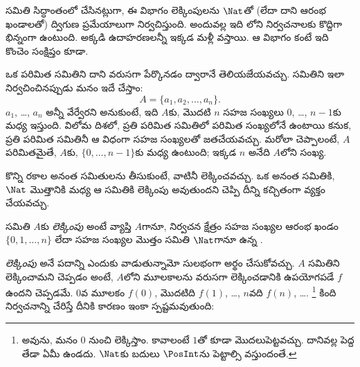 \documentclass[../../../include/open-logic-section]{subfiles}
\begin{document}


\begin{editorial}
  సమితి సిద్ధాంతంలో చేసినట్లుగా, ఈ విభాగం లెక్కింపులను $\Nat$తో
  (లేదా దాని ఆరంభ ఖండాలతో) ద్విగుణ ప్రమేయాలుగా నిర్వచిస్తుంది.
  అందువల్ల ఇది లోని నిర్వచనాలకు కొద్దిగా భిన్నంగా ఉంటుంది.
  అక్కడి ఉదాహరణలన్నీ ఇక్కడ మళ్లీ వస్తాయి. ఆ విభాగం కంటే ఇది
  కొంచెం సంక్షిప్తం కూడా.
\end{editorial}

ఒక పరిమిత సమితిని దాని  వరుసగా పేర్కొనడం ద్వారానే
తెలియజేయవచ్చు. సమితిని ఇలా నిర్వచించినప్పుడు మనం ఇదే చేస్తాం:
\[
  A = \{a_1, a_2, \ldots, a_n\}.
\]
 $a_1$, \dots, $a_n$ అన్నీ వేర్వేరని అనుకుంటే, ఇది $A$కు,
మొదటి $n$ సహజ సంఖ్యలు $0$, \dots, $n-1$కు మధ్య 
ఇస్తుంది. విలోమ దిశలో, ప్రతి పరిమిత సమితిలో పరిమిత సంఖ్యలోనే 
ఉంటాయి కనుక, ప్రతి పరిమిత సమితినీ ఆ విధంగా సహజ సంఖ్యలతో జతచేయవచ్చు.
మరోలా చెప్పాలంటే, $A$ పరిమితమైతే, $A$కు, $\{0, \dots, n-1\}$కు
మధ్య  ఉంటుంది; ఇక్కడ $n$ అనేది $A$లోని 
సంఖ్య.

కొన్ని రకాల అనంత సమితులను తీసుకుంటే, వాటినీ
లెక్కించవచ్చు. ఒక అనంత సమితికి, $\Nat$ మొత్తానికి మధ్య
 ఆ సమితికి లెక్కింపు అవుతుందని చెప్పి దీన్ని కచ్చితంగా
వ్యక్తం చేయవచ్చు.

\begin{defn}[లెక్కింపు, సమితి-సిద్ధాంత రూపం]
సమితి $A$కు \emph{లెక్కింపు} అంటే వ్యాప్తి $A$గానూ, నిర్వచన క్షేత్రం
సహజ సంఖ్యల ఆరంభ ఖండం $\{0, 1, \ldots, n\}$ లేదా సహజ సంఖ్యల
మొత్తం సమితి $\Nat$గానూ ఉన్న .
\end{defn}

\begin{explain}
\emph{లెక్కింపు} అనే పదాన్ని ఎందుకు వాడుతున్నామో సులభంగా అర్థం చేసుకోవచ్చు. $A$
సమితిని లెక్కించామని చెప్పడం అంటే, $A$లోని మూలకాలను వరుసగా లెక్కించడానికి
ఉపయోగపడే  $f$ ఉందని చెప్పడమే. $0$వ మూలకం $f(0)$,
మొదటిది $f(1)$, \ldots, $n$వది $f(n)$, \ldots.
\footnote{అవును, మనం $0$ నుంచి లెక్కిస్తాం. కావాలంటే $1$తో కూడా
మొదలుపెట్టవచ్చు. దానివల్ల పెద్ద తేడా ఏమీ ఉండదు. $\Nat$కు బదులు
$\PosInt$ను పెట్టాల్సి వస్తుందంతే.} కింది నిర్వచనాన్ని చేరిస్తే
దీనికి కారణం ఇంకా స్పష్టమవుతుంది:
\end{explain}
\end{document}
